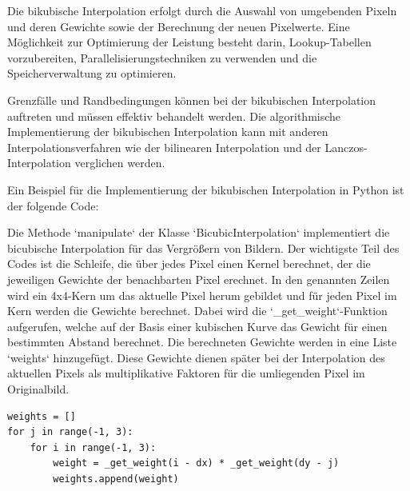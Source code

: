 
    
Die bikubische Interpolation erfolgt durch die Auswahl von umgebenden Pixeln und deren Gewichte sowie der Berechnung der neuen Pixelwerte. Eine Möglichkeit zur Optimierung der Leistung besteht darin, Lookup-Tabellen vorzubereiten, Parallelisierungstechniken zu verwenden und die Speicherverwaltung zu optimieren.

Grenzfälle und Randbedingungen können bei der bikubischen Interpolation auftreten und müssen effektiv behandelt werden. Die algorithmische Implementierung der bikubischen Interpolation kann mit anderen Interpolationsverfahren wie der bilinearen Interpolation und der Lanczos-Interpolation verglichen werden.

Ein Beispiel für die Implementierung der bikubischen Interpolation in Python ist der folgende Code:

Die Methode `manipulate` der Klasse `BicubicInterpolation` implementiert die bicubische Interpolation für das Vergrößern von Bildern. Der wichtigste Teil des Codes ist die Schleife, die über jedes Pixel einen Kernel berechnet, der die jeweiligen Gewichte der benachbarten Pixel erechnet. In den genannten Zeilen wird ein 4x4-Kern um das aktuelle Pixel herum gebildet und für jeden Pixel im Kern werden die Gewichte berechnet. Dabei wird die `_get_weight`-Funktion aufgerufen, welche auf der Basis einer kubischen Kurve das Gewicht für einen bestimmten Abstand berechnet. Die berechneten Gewichte werden in eine Liste `weights` hinzugefügt. Diese Gewichte dienen später bei der Interpolation des aktuellen Pixels als multiplikative Faktoren für die umliegenden Pixel im Originalbild.


\begin{lstlisting}
weights = []
for j in range(-1, 3):
    for i in range(-1, 3):
        weight = _get_weight(i - dx) * _get_weight(dy - j)
        weights.append(weight)
\end{lstlisting}

